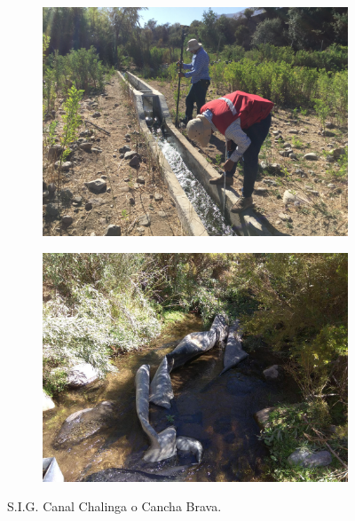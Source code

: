\documentclass[]{article}
\begin{document}
\begin{figure}[H]
  \centering
\begin{subfigure}{.45\textwidth}
\hfill
  \includegraphics[angle= 180, width=\textwidth]{Foto/ch1.jpg}
\end{subfigure}
\hfill
\begin{subfigure}{.45\textwidth}
\hfill
  \includegraphics[width=\textwidth]{Foto/ch2.jpg} 
\end{subfigure}
\caption{S.I.G. Canal Chalinga o Cancha Brava.}
\end{figure}
\end{document}
